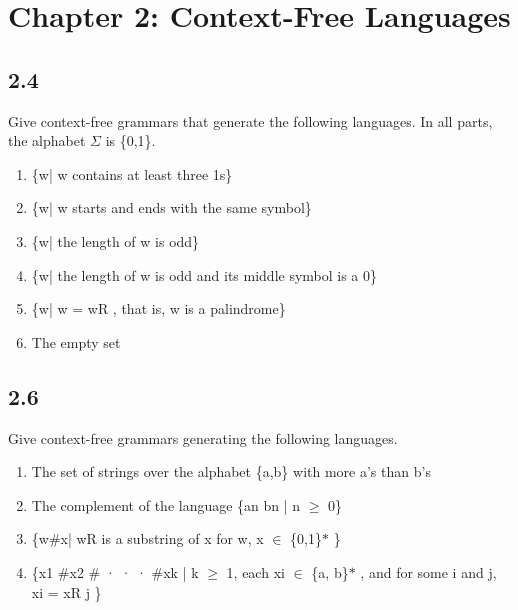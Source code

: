\section*{Chapter 2: Context-Free Languages}

\subsection*{2.4}

Give context-free grammars that generate the following languages. In all parts, the alphabet $\Sigma$ is \{0,1\}.

\begin{enumerate}[label=(\alph*), leftmargin=2.5em]

\item \{w| w contains at least three 1s\}

\item \{w| w starts and ends with the same symbol\}

\item \{w| the length of w is odd\}

\item \{w| the length of w is odd and its middle symbol is a 0\}

\item \{w| w = wR , that is, w is a palindrome\}

\item The empty set

\end{enumerate}


\subsection*{2.6}

Give context-free grammars generating the following languages.

\begin{enumerate}[label=(\alph*), leftmargin=2.5em]

\item The set of strings over the alphabet \{a,b\} with more a's than b's

\item The complement of the language \{an bn | n $\ge$ 0\}

\item \{w\#x| wR is a substring of x for w, x $\in$ \{0,1\}$\ast$ \}

\item \{x1 \#x2 \# · · · \#xk | k $\ge$ 1, each xi $\in$ \{a, b\}$\ast$ , and for some i and j, xi = xR j \}

\end{enumerate}


